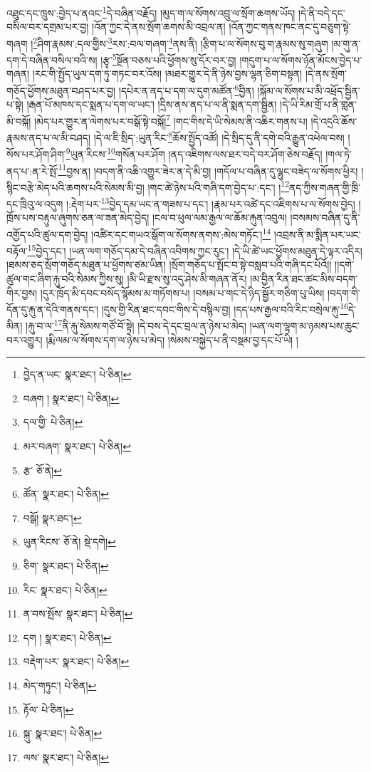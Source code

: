 འཐུང་དང་ཁྲུས་:བྱེད་པ་ནའང་\footnote{བྱེད་ན་ཡང་  སྣར་ཐང་།  པེ་ཅིན། }དེ་བཞིན་བརྗོད། །མུད་ག་ལ་སོགས་འབྲུ་ལ་སྲོག་ཆགས་ཡོད། །དེ་ནི་བདེ་དང་བསིལ་བར་དགྲམ་པར་བྱ། །འོན་ཀྱང་དེ་ནས་སྲོག་ཆགས་མི་འབྲལ་ན། །འོན་ཀྱང་གནས་ཁང་ནང་དུ་བཅུག་སྟེ་གཞག །\footnote{བཞག །  སྣར་ཐང་།  པེ་ཅིན། }ཤིག་རྣམས་:དལ་གྱིས་\footnote{དལ་གྱི་  པེ་ཅིན། }རས་:བལ་གཞག་\footnote{མར་བཞག་  སྣར་ཐང་།  པེ་ཅིན། }ནས་ནི། །རྩིག་པ་ལ་སོགས་བུ་ག་རྣམས་སུ་གཞུག །མ་གུ་ན་དག་དེ་བཞིན་བསིལ་བའི་ས། །རྩྭ་\footnote{རྩ་  ཅོ་ནེ། }སྔོན་བཅས་པའི་ཕྱོགས་སུ་དོར་བར་བྱ། །གདུག་པ་ལ་སོགས་ཉོན་མོངས་བྱེད་པ་གཞན། །རང་གི་སྤྱོད་ཡུལ་དག་ཏུ་གཏང་བར་འོས། །མཐར་གྱུར་དེ་ནི་ཉེས་བྱས་ལྷན་ཅིག་བསྟན། །དེ་ནས་སྲོག་གཅོད་ཕྱོགས་མཐུན་བཤད་པར་བྱ། །དཔེར་ན་ནད་པ་དག་ལ་དུག་མཚོན་\footnote{ཚོན་  སྣར་ཐང་།  པེ་ཅིན། }བྱིན། །སྐོམ་ལ་སོགས་པ་མི་འཕྲོད་སྦྱིན་པ་སྟེ། །རྒན་པོ་མཁས་དང་སྨན་པ་དག་ལ་ཡང་། །དྲིས་ནས་ནད་པ་ལ་ནི་སྨན་དག་སྦྱིན། །དེ་ཡི་རིམ་གྲོ་པ་ནི་གླན་མི་བསྐོ། །མེད་པར་གྱུར་ན་ལེགས་པར་བསྒོ་སྟེ་བསྐོ།\footnote{བསྒོ།  སྣར་ཐང་། } །གང་གིས་དེ་ཡི་སེམས་ནི་འཆིར་གནས་པ། །དེ་འདྲའི་ཆོས་རྣམས་ནད་པ་ལ་མི་བཤད། །དེ་ལ་ཇི་སྲིད་:ཡུན་རིང་\footnote{ཡུན་རིངས་  ཅོ་ནེ།  སྡེ་དགེ། }ཆོས་སྤྱོད་འཚོ། །དེ་སྲིད་དུ་ནི་དགེ་བའི་རྒྱུན་འཕེལ་བས། །སོས་པར་ཤོག་ཤིག་\footnote{ཅིག་  སྣར་ཐང་།  པེ་ཅིན། }ཡུན་རིངས་\footnote{རིང་  སྣར་ཐང་།  པེ་ཅིན། }གསོན་པར་ཤོག །ནད་འཇིགས་ལས་ཐར་བདེ་བར་ཤོག་ཅེས་བརྗོད། །གལ་ཏེ་ནད་པ་:ན་རེ་སྤོ་\footnote{ན་བས་སྤོས་  སྣར་ཐང་།  པེ་ཅིན། }བྱས་ན། །བདག་ནི་འཆི་འགྱུར་ཟེར་ན་དེ་མི་བྱ། །གདོལ་པ་བཞིན་དུ་ལྷུང་བཟེད་ལ་སོགས་ཕྱིར། །སྙིང་བརྩེ་མེད་པའི་ཆགས་པའི་སེམས་མི་བྱ། །གང་ཚེ་ཉེས་པའི་གཞི་དག་བྱེད་པ་:དང་། །\footnote{དག །  སྣར་ཐང་།  པེ་ཅིན། }ནད་ཀྱིས་གཞན་གྱི་ཁྲི་དང་ཁྲིའུ་ལ་འདུག །:རྡེག་པར་\footnote{བརྡེག་པར་  སྣར་ཐང་།  པེ་ཅིན། }བྱེད་དམ་ཡང་ན་གཟས་པ་དང་། །རྣམ་པར་འཚེ་དང་འཇིགས་པ་ལ་སོགས་བྱེད། །ཁྲོས་པས་བརྟུལ་ཞུགས་ཅན་ལ་ཟན་མེད་བྱེད། །ངལ་བ་ཕུལ་ལམ་རྒྱལ་ལ་ཆོམ་རྐུན་འབུལ། །བསམས་བཞིན་དུ་ནི་འགྱོད་པའི་ཚུལ་དག་བྱེད། །འཚིར་དང་གཡའ་སྒོག་ལ་སོགས་ནགས་:མེས་གཏོང་།\footnote{མེད་གཏུང་།  པེ་ཅིན། } །འབྲས་ནི་མ་སྨིན་པར་ཡང་བརྟོལ་\footnote{རྟོལ་  པེ་ཅིན། }བྱེད་དང་། །ཡན་ལག་གཅོད་དམ་དེ་བཞིན་འབིགས་ཀྱང་རུང་། །དེ་ཡི་ཚེ་ཡང་ཕྱོགས་མཐུན་དེ་ལྟར་འདིར། །ཐམས་ཅད་སྲོག་གཅོད་མཐུན་པ་ཕྱོགས་ཙམ་ཡིན། །སྲོག་གཅོད་པ་སྤོང་བ་སྟེ་བསླབ་པའི་གཞི་དང་པོའོ།། །།དགེ་ཚུལ་གང་ཞིག་རྐུ་བའི་སེམས་ཀྱིས་སུ། །མི་ཡི་རྫས་སུ་འདུ་ཤེས་མི་གཞན་ནོར། །མ་བྱིན་རིན་ཐང་ཚང་མིས་བདག་གིར་བྱས། །དུར་ཁྲོད་མི་དབང་བསོད་སྙོམས་མ་གཏོགས་པ། །བསམ་པ་གང་དེ་ཉིད་སྦྱོར་གཅིག་པུ་ཡིས། །བདག་གི་དོན་དུ་རྐུ་ན་དེའི་གནས་དང་། །དུས་གྱི་རིན་ཐང་དབང་གིས་དེ་བསྙིལ་བྱ། །དད་པས་རྒྱལ་བའི་རིང་བསྲེལ་རྐུ་\footnote{སྐུ་  སྣར་ཐང་།  པེ་ཅིན། }དེ་མིན། །རྐུ་བ་ལ་\footnote{ལས་  སྣར་ཐང་།  པེ་ཅིན། }ནི་རྐུ་སེམས་གཙོ་བོ་སྟེ། །དེ་བས་དེ་དང་བྲལ་ན་ཉེས་པ་མེད། །ཡན་ལག་ལྷག་མ་ཉམས་པས་ཆུང་བར་འགྱུར། །རྨི་ལམ་ལ་སོགས་དག་ལ་ཉེས་པ་མེད། །སེམས་བསྐྱེད་པ་ནི་བསྡམ་བྱ་དང་པོ་ཡི། །
